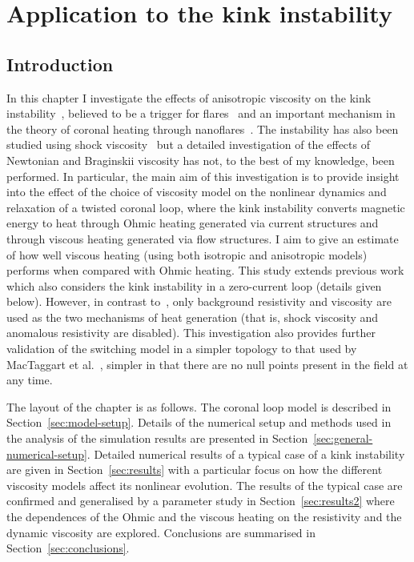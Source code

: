 \chapter{Application to the kink instability}
\label{chp:kink_instability}

\graphicspath{{images/kink_instability/}}

\section{Introduction}
\label{sec:kink_introduction}

In this chapter I investigate the effects of anisotropic viscosity on the kink instability~\cite{hoodKinkInstabilitySolar1979, hoodCoronalHeatingMagnetic2009}, believed to be a trigger for flares~\cite{srivastavaObservationKinkInstability2010} and an important mechanism in the theory of coronal heating through nanoflares~\cite{browningHeatingCoronaNanoflares2008a}. The instability has also been studied using shock viscosity~\cite{hoodCoronalHeatingMagnetic2009,barefordShockHeatingNumerical2015} but a detailed investigation of the effects of Newtonian and Braginskii viscosity has not, to the best of my knowledge, been performed. In particular, the main aim of this investigation is to provide insight into the effect of the choice of viscosity model on the nonlinear dynamics and relaxation of a twisted coronal loop, where the kink instability converts magnetic energy to heat through Ohmic heating generated via current structures and through viscous heating generated via flow structures. I aim to give an estimate of how well viscous heating (using both isotropic and anisotropic models) performs when compared with Ohmic heating. This study extends previous work~\cite{hoodCoronalHeatingMagnetic2009} which also considers the kink instability in a zero-current loop (details given below). However, in contrast to~\cite{hoodCoronalHeatingMagnetic2009}, only background resistivity and viscosity are used as the two mechanisms of heat generation (that is, shock viscosity and anomalous resistivity are disabled). This investigation also provides further validation of the switching model in a simpler topology to that used by MacTaggart et al.~\cite{mactaggartBraginskiiMagnetohydrodynamicsArbitrary2017}, simpler in that there are no null points present in the field at any time.

The layout of the chapter is as follows. The coronal loop model is described in Section~\ref{sec:model-setup}. Details of the numerical setup and methods used in the analysis of the simulation results are presented in Section~\ref{sec:general-numerical-setup}. Detailed numerical results of a typical case of a kink instability are given in Section~\ref{sec:results} with a particular focus on how the different viscosity models affect its nonlinear evolution. The results of the typical case are confirmed and generalised by a parameter study in Section~\ref{sec:results2} where the dependences of the Ohmic and the viscous heating on the resistivity and the dynamic viscosity are explored. Conclusions are summarised in Section~\ref{sec:conclusions}.

